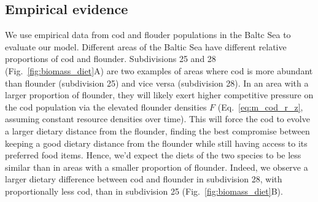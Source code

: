 \documentclass[9pt,twocolumn,twoside]{pnas-new}
\begin{document}


\subsection*{Empirical evidence}

We use empirical data from cod and flouder populations in the Baltc Sea to evaluate our model. Different areas of the Baltic Sea have different relative proportions of cod and flounder. Subdivisions 25 and 28 (Fig.~\ref{fig:biomass_diet}A) are two examples of areas where cod is more abundant than flounder (subdivision 25) and vice versa (subdivision 28). In an area with a larger proportion of flounder, they will likely exert higher competitive pressure on the cod population via the elevated flounder densities $F$ (Eq.~\ref{eq:m_cod_r_z}, assuming constant resource densities over time). This will force the cod to evolve a larger dietary distance from the flounder, finding the best compromise between keeping a good dietary distance from the flounder while still having access to its preferred food items. Hence, we'd expect the diets of the two species to be less similar than in areas with a smaller proportion of flounder. Indeed, we observe a larger dietary difference between cod and flounder in subdivision 28, with proportionally less cod, than in subdivision 25 (Fig.~\ref{fig:biomass_diet}B).
\end{document}

